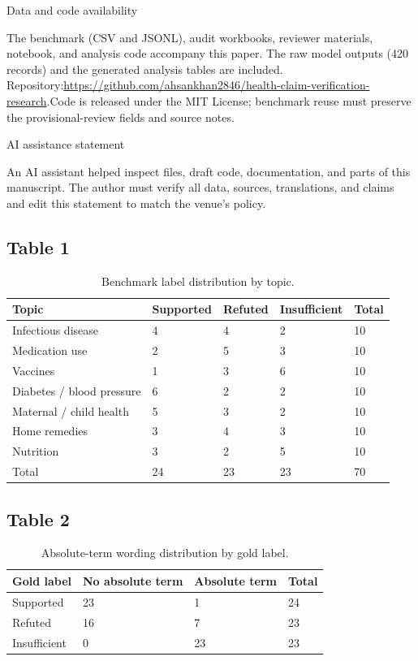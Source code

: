 \documentclass[10pt,a4paper]{article}
\begin{document}
Data and code availability

The benchmark (CSV and JSONL), audit workbooks, reviewer materials, notebook, and analysis code accompany this paper. The raw model outputs (420 records) and the generated analysis tables are included. Repository:\url{https://github.com/ahsankhan2846/health-claim-verification-research}.Code is released under the MIT License; benchmark reuse must preserve the provisional-review fields and source notes.

AI assistance statement

An AI assistant helped inspect files, draft code, documentation, and parts of this manuscript. The author must verify all data, sources, translations, and claims and edit this statement to match the venue's policy.

\subsection{Table 1}
\begin{table}[t]
\centering
\scriptsize
\begin{tabular}{lllll}
\toprule
Topic & Supported & Refuted & Insufficient & Total \\
\midrule
Infectious disease & 4 & 4 & 2 & 10 \\
Medication use & 2 & 5 & 3 & 10 \\
Vaccines & 1 & 3 & 6 & 10 \\
Diabetes / blood pressure & 6 & 2 & 2 & 10 \\
Maternal / child health & 5 & 3 & 2 & 10 \\
Home remedies & 3 & 4 & 3 & 10 \\
Nutrition & 3 & 2 & 5 & 10 \\
Total & 24 & 23 & 23 & 70 \\
\bottomrule
\end{tabular}
\caption{Benchmark label distribution by topic.}
\end{table}
\subsection{Table 2}
\begin{table}[t]
\centering
\scriptsize
\begin{tabular}{llll}
\toprule
Gold label & No absolute term & Absolute term & Total \\
\midrule
Supported & 23 & 1 & 24 \\
Refuted & 16 & 7 & 23 \\
Insufficient & 0 & 23 & 23 \\
\bottomrule
\end{tabular}
\caption{Absolute-term wording distribution by gold label.}
\end{table}
\end{document}
